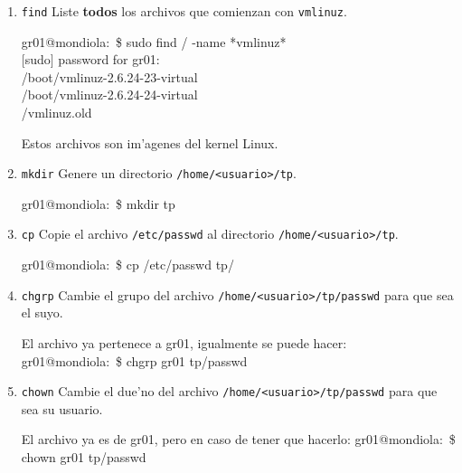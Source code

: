 \begin{enumerate}

\item \texttt{find} Liste \textbf{todos} los archivos que comienzan con \texttt{vmlinuz}.

\begin{envRespuesta}
gr01@mondiola:~\$ sudo find / -name *vmlinuz* \\
$[$sudo$]$ password for gr01: \\
/boot/vmlinuz-2.6.24-23-virtual\\
/boot/vmlinuz-2.6.24-24-virtual\\
/vmlinuz.old
\end{envRespuesta}

Estos archivos son im'agenes del kernel Linux.

\item \texttt{mkdir} Genere un directorio \texttt{/home/<usuario>/tp}.

\begin{envRespuesta}
gr01@mondiola:~\$ mkdir tp
\end{envRespuesta}

\item \texttt{cp} Copie el archivo \texttt{/etc/passwd} al directorio \texttt{/home/<usuario>/tp}.

\begin{envRespuesta}
gr01@mondiola:~\$ cp /etc/passwd tp/
\end{envRespuesta}

\item \texttt{chgrp} Cambie el grupo del archivo \texttt{/home/<usuario>/tp/passwd} para que sea el suyo.

\begin{envRespuesta}
El archivo ya pertenece a gr01, igualmente se puede hacer:\\
gr01@mondiola:~\$ chgrp gr01 tp/passwd
\end{envRespuesta}

\item \texttt{chown} Cambie el due'no del archivo \texttt{/home/<usuario>/tp/passwd} para que sea su usuario.

\begin{envRespuesta}
El archivo ya es de gr01, pero en caso de tener que hacerlo: 
gr01@mondiola:~\$ chown gr01 tp/passwd
\end{envRespuesta}


\end{enumerate}
